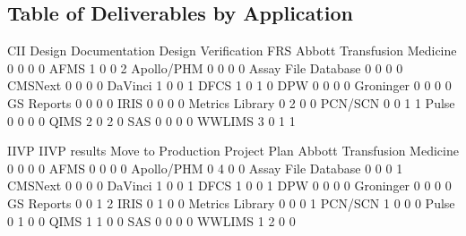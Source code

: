 \documentclass{article}
\begin{document}
\subsection{Table of Deliverables by Application}
\begin{Schunk}
\begin{Soutput}
                              CII Design Documentation Design Verification FRS
  Abbott Transfusion Medicine   0                    0                   0   0
  AFMS                          1                    0                   0   2
  Apollo/PHM                    0                    0                   0   0
  Assay File Database           0                    0                   0   0
  CMSNext                       0                    0                   0   0
  DaVinci                       1                    0                   0   1
  DFCS                          1                    0                   1   0
  DPW                           0                    0                   0   0
  Groninger                     0                    0                   0   0
  GS Reports                    0                    0                   0   0
  IRIS                          0                    0                   0   0
  Metrics Library               0                    2                   0   0
  PCN/SCN                       0                    0                   1   1
  Pulse                         0                    0                   0   0
  QIMS                          2                    0                   2   0
  SAS                           0                    0                   0   0
  WWLIMS                        3                    0                   1   1
                             
                              IIVP IIVP results Move to Production Project Plan
  Abbott Transfusion Medicine    0            0                  0            0
  AFMS                           0            0                  0            0
  Apollo/PHM                     0            4                  0            0
  Assay File Database            0            0                  0            1
  CMSNext                        0            0                  0            0
  DaVinci                        1            0                  0            1
  DFCS                           1            0                  0            1
  DPW                            0            0                  0            0
  Groninger                      0            0                  0            0
  GS Reports                     0            0                  1            2
  IRIS                           0            1                  0            0
  Metrics Library                0            0                  0            1
  PCN/SCN                        1            0                  0            0
  Pulse                          0            1                  0            0
  QIMS                           1            1                  0            0
  SAS                            0            0                  0            0
  WWLIMS                         1            2                  0            0
                             

\end{Soutput}
\end{Schunk}
\end{document}
